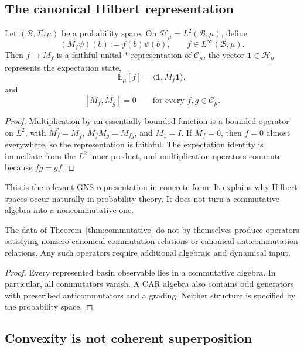\documentclass[11pt]{article}
\newcommand{\C}{\mathcal C}
\newcommand{\B}{\mathcal B}
\newcommand{\Hspace}{\mathcal H}
\newcommand{\E}{\mathbb E}
\begin{document}
\subsection{The canonical Hilbert representation}

\begin{theorem}
\label{thm:commutative}
Let \((\B,\Sigma,\mu)\) be a probability space.  On
\(\Hspace_\mu=L^2(\B,\mu)\), define
\[
 (M_f\psi)(b):=f(b)\psi(b),
 \qquad f\in L^\infty(\B,\mu).
\]
Then \(f\mapsto M_f\) is a faithful unital \(*\)-representation of
\(\C_\mu\), the vector \(\mathbf 1\in\Hspace_\mu\) represents the
expectation state,
\[
 \E_\mu[f]=\langle\mathbf 1,M_f\mathbf 1\rangle,
\]
and
\[
 [M_f,M_g]=0
 \qquad\text{for every }f,g\in\C_\mu.
\]
\end{theorem}

\begin{proof}
Multiplication by an essentially bounded function is a bounded operator on
\(L^2\), with \(M_f^*=M_{\overline f}\),
\(M_fM_g=M_{fg}\), and \(M_1=I\).  If \(M_f=0\), then \(f=0\) almost
everywhere, so the representation is faithful.  The expectation identity
is immediate from the \(L^2\) inner product, and multiplication operators
commute because \(fg=gf\).
\end{proof}

This is the relevant GNS representation in concrete form.  It explains why
Hilbert spaces occur naturally in probability theory.  It does not turn a
commutative algebra into a noncommutative one.

\begin{corollary}
\label{cor:no-car}
The data of Theorem~\ref{thm:commutative} do not by themselves produce
operators satisfying nonzero canonical commutation relations or canonical
anticommutation relations.  Any such operators require additional algebraic
and dynamical input.
\end{corollary}

\begin{proof}
Every represented basin observable lies in a commutative algebra.  In
particular, all commutators vanish.  A CAR algebra also contains odd
generators with prescribed anticommutators and a grading.  Neither structure
is specified by the probability space.
\end{proof}

\subsection{Convexity is not coherent superposition}
\leavevmode\par
\end{document}
